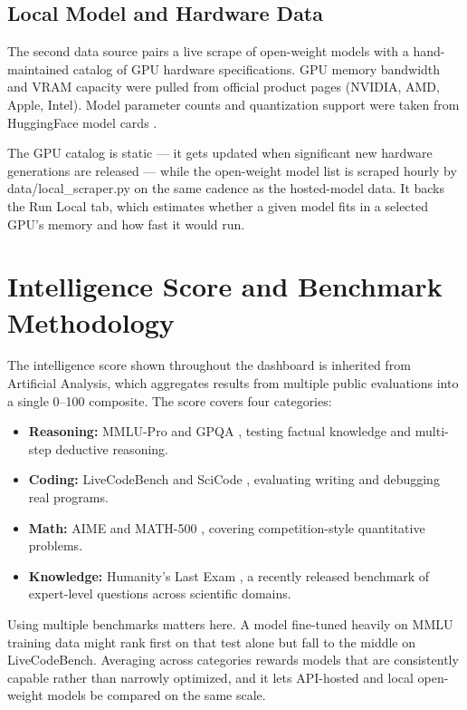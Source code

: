\documentclass{article}
\begin{document}
\subsection{Local Model and Hardware Data}

The second data source pairs a live scrape of open-weight models with a
hand-maintained catalog of GPU hardware specifications. GPU memory bandwidth and VRAM capacity were
pulled from official product pages (NVIDIA, AMD, Apple, Intel). Model
parameter counts and quantization support were taken from HuggingFace model
cards \cite{huggingface}.

The GPU catalog is static --- it gets updated when significant new hardware
generations are released --- while the open-weight model list is scraped hourly
by data/local\_scraper.py on the same cadence as the hosted-model data. It backs the Run
Local tab, which estimates whether a given model fits in a selected GPU's
memory and how fast it would run.

\section{Intelligence Score and Benchmark Methodology}

The intelligence score shown throughout the dashboard is inherited from
Artificial Analysis, which aggregates results from multiple public
evaluations into a single 0--100 composite. The score covers four categories:

\begin{itemize}
  \item \textbf{Reasoning:} MMLU-Pro \cite{mmlu_pro} and GPQA \cite{gpqa},
        testing factual knowledge and multi-step deductive reasoning.
  \item \textbf{Coding:} LiveCodeBench \cite{livecodebench} and SciCode
        \cite{scicode}, evaluating writing and debugging real programs.
  \item \textbf{Math:} AIME and MATH-500 \cite{math500}, covering
        competition-style quantitative problems.
  \item \textbf{Knowledge:} Humanity's Last Exam \cite{hle}, a recently
        released benchmark of expert-level questions across scientific domains.
\end{itemize}

Using multiple benchmarks matters here. A model fine-tuned heavily on MMLU
training data might rank first on that test alone but fall to the middle on
LiveCodeBench. Averaging across categories rewards models that are
consistently capable rather than narrowly optimized, and it lets API-hosted
and local open-weight models be compared on the same scale.
\end{document}
